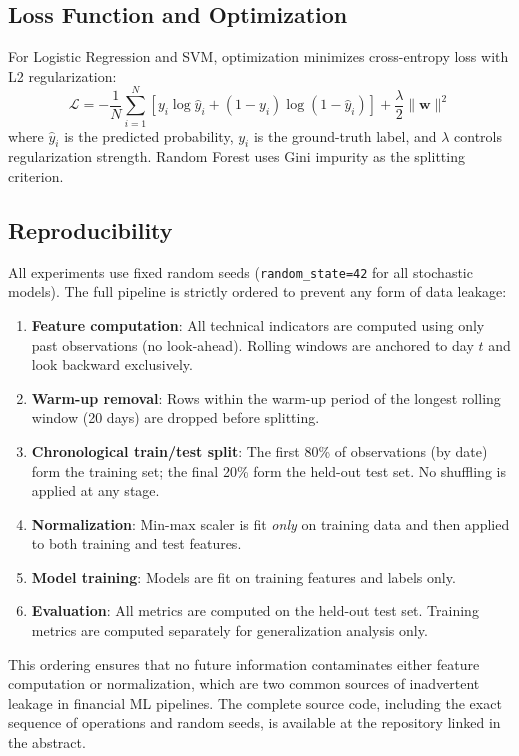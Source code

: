 \documentclass{article}
\begin{document}
\subsection{Loss Function and Optimization}

For Logistic Regression and SVM, optimization minimizes cross-entropy loss with
L2 regularization:
\[
\mathcal{L} = -\frac{1}{N}\sum_{i=1}^{N} \left[ y_i \log \hat{y}_i + (1-y_i)
\log(1-\hat{y}_i) \right] + \frac{\lambda}{2} \|\mathbf{w}\|^2
\]
where $\hat{y}_i$ is the predicted probability, $y_i$ is the ground-truth label,
and $\lambda$ controls regularization strength. Random Forest uses Gini impurity
as the splitting criterion.

\subsection{Reproducibility}

All experiments use fixed random seeds (\texttt{random\_state=42} for all
stochastic models). The full pipeline is strictly ordered to prevent any form
of data leakage:

\begin{enumerate}
    \item \textbf{Feature computation}: All technical indicators are computed
    using only past observations (no look-ahead). Rolling windows are anchored
    to day $t$ and look backward exclusively.
    \item \textbf{Warm-up removal}: Rows within the warm-up period of the
    longest rolling window (20 days) are dropped before splitting.
    \item \textbf{Chronological train/test split}: The first 80\% of
    observations (by date) form the training set; the final 20\% form the
    held-out test set. No shuffling is applied at any stage.
    \item \textbf{Normalization}: Min-max scaler is fit \emph{only} on
    training data and then applied to both training and test features.
    \item \textbf{Model training}: Models are fit on training features and
    labels only.
    \item \textbf{Evaluation}: All metrics are computed on the held-out test
    set. Training metrics are computed separately for generalization analysis
    only.
\end{enumerate}

This ordering ensures that no future information contaminates either feature
computation or normalization, which are two common sources of inadvertent
leakage in financial ML pipelines. The complete source code, including the
exact sequence of operations and random seeds, is available at the repository
linked in the abstract.
\end{document}
